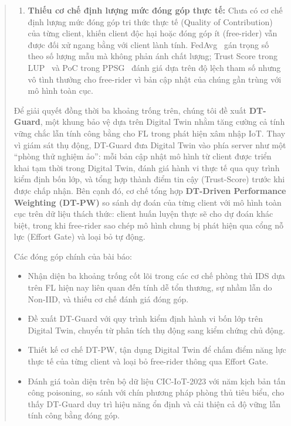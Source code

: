 \documentclass[runningheads]{llncs}
\begin{document}
\begin{abstract}
\begin{enumerate}
    \item \textbf{Thiếu cơ chế định lượng mức đóng góp thực tế:} Chưa có cơ chế định lượng mức đóng góp tri thức thực tế (Quality of Contribution) của từng client, khiến client độc hại hoặc đóng góp ít (free-rider) vẫn được đối xử ngang bằng với client lành tính. FedAvg~\cite{mcmahan2016communication} gán trọng số theo số lượng mẫu mà không phản ánh chất lượng; Trust Score trong LUP~\cite{issa2025dtbfl} và PoC trong PPSG~\cite{zhang2025ppsg} đánh giá dựa trên độ lệch tham số nhưng vô tình thưởng cho free-rider vì bản cập nhật của chúng gần trùng với mô hình toàn cục.
\end{enumerate}

Để giải quyết đồng thời ba khoảng trống trên, chúng tôi đề xuất \textbf{DT-Guard}, một khung bảo vệ dựa trên Digital Twin nhằm tăng cường cả tính vững chắc lẫn tính công bằng cho FL trong phát hiện xâm nhập IoT. Thay vì giám sát thụ động, DT-Guard đưa Digital Twin vào phía server như một ``phòng thử nghiệm ảo'': mỗi bản cập nhật mô hình từ client được triển khai tạm thời trong Digital Twin, đánh giá hành vi thực tế qua quy trình kiểm định bốn lớp, và tổng hợp thành điểm tin cậy (Trust-Score) trước khi được chấp nhận. Bên cạnh đó, cơ chế tổng hợp \textbf{DT-Driven Performance Weighting (DT-PW)} so sánh dự đoán của từng client với mô hình toàn cục trên dữ liệu thách thức: client huấn luyện thực sẽ cho dự đoán khác biệt, trong khi free-rider sao chép mô hình chung bị phát hiện qua cổng nỗ lực (Effort Gate) và loại bỏ tự động.

Các đóng góp chính của bài báo:

\begin{itemize}
    \item Nhận diện ba khoảng trống cốt lõi trong các cơ chế phòng thủ IDS dựa trên FL hiện nay liên quan đến tính dễ tổn thương, sự nhầm lẫn do Non-IID, và thiếu cơ chế đánh giá đóng góp.

    \item Đề xuất DT-Guard với quy trình kiểm định hành vi bốn lớp trên Digital Twin, chuyển từ phân tích thụ động sang kiểm chứng chủ động.

    \item Thiết kế cơ chế DT-PW, tận dụng Digital Twin để chấm điểm năng lực thực tế của từng client và loại bỏ free-rider thông qua Effort Gate.

    \item Đánh giá toàn diện trên bộ dữ liệu CIC-IoT-2023 với năm kịch bản tấn công poisoning, so sánh với chín phương pháp phòng thủ tiêu biểu, cho thấy DT-Guard duy trì hiệu năng ổn định và cải thiện cả độ vững lẫn tính công bằng đóng góp.
\end{itemize}



\end{abstract}
\end{document}

